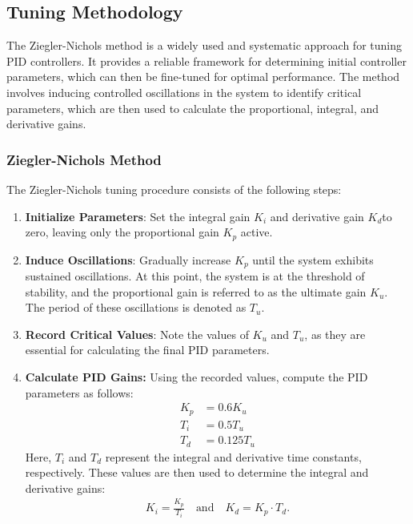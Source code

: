 \subsection{Tuning Methodology}
The Ziegler-Nichols method is a widely used and systematic approach for tuning PID controllers. It provides a reliable framework for determining initial controller parameters, which can then be fine-tuned for optimal performance. The method involves inducing controlled oscillations in the system to identify critical parameters, which are then used to calculate the proportional, integral, and derivative gains.
\subsubsection{Ziegler-Nichols Method}
The Ziegler-Nichols tuning procedure consists of the following steps:
\begin{enumerate}
	\item \textbf{Initialize Parameters}: Set the integral gain \( K_i \) and derivative gain \( K_d \)to zero, leaving only the proportional gain \( K_p \) active.
	\item \textbf{Induce Oscillations}: Gradually increase \( K_p \) until the system exhibits sustained oscillations. At this point, the system is at the threshold of stability, and the proportional gain is referred to as the ultimate gain \( K_u \). The period of these oscillations is denoted as \( T_u \).
	\item \textbf{Record Critical Values}: Note the values of \( K_u \) and \( T_u \), as they are essential for calculating the final PID parameters.
	\item \textbf{Calculate PID Gains:} Using the recorded values, compute the PID parameters as follows:
	\begin{equation}
		\begin{aligned}
			K_p &= 0 . 6K_u \\
			T_i &= 0 . 5T_u \\
			T_d &= 0 . 125T_u  \label{eq:eq}
		\end{aligned}
	\end{equation}
	Here, \( T_i \) and \( T_d \) represent the integral and derivative time constants, respectively. These values are then used to determine the integral and derivative gains:
	\begin{equation}
		\begin{aligned}
			K_i = \frac{K_p}{T_i} \quad \text{and} \quad K_d = K_p \cdot T_d.  \label{eq:eq}
		\end{aligned}
	\end{equation}
\end{enumerate}

